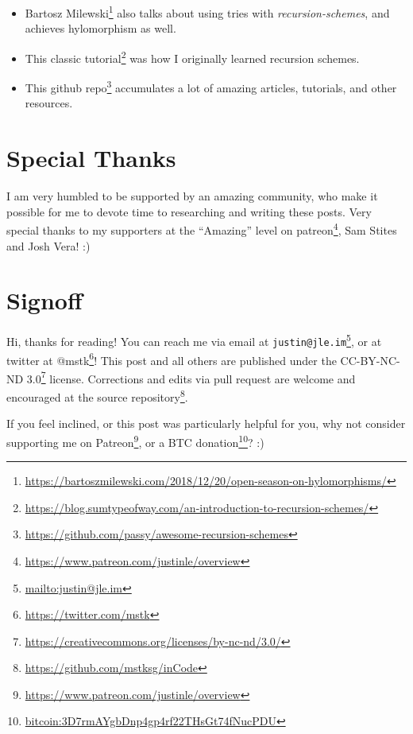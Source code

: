 \documentclass[]{article}
\renewcommand{\href}[2]{#2\footnote{\url{#1}}}
\begin{document}
\begin{itemize}
\tightlist
\item
  \href{https://bartoszmilewski.com/2018/12/20/open-season-on-hylomorphisms/}{Bartosz
  Milewski} also talks about using tries with \emph{recursion-schemes}, and
  achieves hylomorphism as well.
\item
  \href{https://blog.sumtypeofway.com/an-introduction-to-recursion-schemes/}{This
  classic tutorial} was how I originally learned recursion schemes.
\item
  \href{https://github.com/passy/awesome-recursion-schemes}{This github repo}
  accumulates a lot of amazing articles, tutorials, and other resources.
\end{itemize}

\hypertarget{special-thanks}{%
\section{Special Thanks}\label{special-thanks}}

I am very humbled to be supported by an amazing community, who make it possible
for me to devote time to researching and writing these posts. Very special
thanks to my supporters at the ``Amazing'' level on
\href{https://www.patreon.com/justinle/overview}{patreon}, Sam Stites and Josh
Vera! :)

\hypertarget{signoff}{%
\section{Signoff}\label{signoff}}

Hi, thanks for reading! You can reach me via email at
\href{mailto:justin@jle.im}{\nolinkurl{justin@jle.im}}, or at twitter at
\href{https://twitter.com/mstk}{@mstk}! This post and all others are published
under the \href{https://creativecommons.org/licenses/by-nc-nd/3.0/}{CC-BY-NC-ND
3.0} license. Corrections and edits via pull request are welcome and encouraged
at \href{https://github.com/mstksg/inCode}{the source repository}.

If you feel inclined, or this post was particularly helpful for you, why not
consider \href{https://www.patreon.com/justinle/overview}{supporting me on
Patreon}, or a \href{bitcoin:3D7rmAYgbDnp4gp4rf22THsGt74fNucPDU}{BTC donation}?
:)
\end{document}
